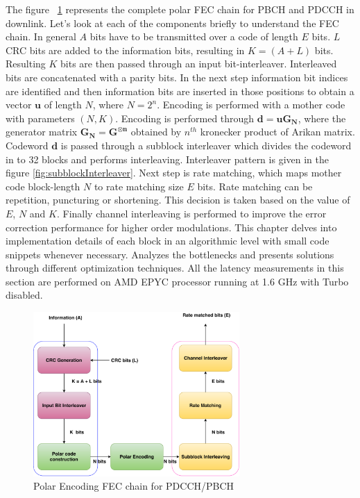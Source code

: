 The figure ~\ref{fig:5g_txfec_chain} represents the complete polar FEC chain for PBCH and PDCCH in downlink. Let's look at each of the components briefly to understand the FEC chain. In general $A$ bits have to be transmitted over a code of length $E$ bits. $L$ CRC bits are added to the information bits, resulting in  $K = (A + L)$ bits. Resulting $K$ bits are then passed through an input bit-interleaver. Interleaved bits are concatenated with a parity bits. In the next step information bit indices are identified and then information bits are inserted in those positions to obtain a vector $\boldsymbol{u}$ of length $N$, where $N = 2^{n}$. Encoding is performed with a mother code with parameters $(N,K)$. Encoding is performed through $\boldsymbol{d = uG_{N}}$, where the generator matrix $\boldsymbol{G_{N} = G^{\otimes n}}$ obtained by $n^{th}$ kronecker product of Arikan matrix. Codeword $\boldsymbol{d}$ is passed through a subblock interleaver which divides the codeword in to 32 blocks and performs interleaving. Interleaver pattern is given in the figure \ref{fig:subblockInterleaver}. Next step is rate matching, which maps mother code block-length $N$ to rate matching size $E$ bits. Rate matching can be repetition, puncturing or shortening. This decision is taken based on the value of $E$, $N$ and $K$. Finally channel interleaving is performed to improve the error correction performance for higher order modulations. This chapter delves into implementation details of each block in an algorithmic level with small code snippets whenever necessary. Analyzes the bottlenecks and presents solutions through different optimization techniques. All the latency measurements in this section are performed on AMD EPYC processor running at 1.6 GHz with Turbo disabled.


\begin{figure}[h]
	\centering
	\includegraphics[width=0.7\textwidth]{./figures/5GFECChain.pdf}
	\caption{Polar Encoding FEC chain for PDCCH/PBCH}
	\label{fig:5g_txfec_chain}
\end{figure}

